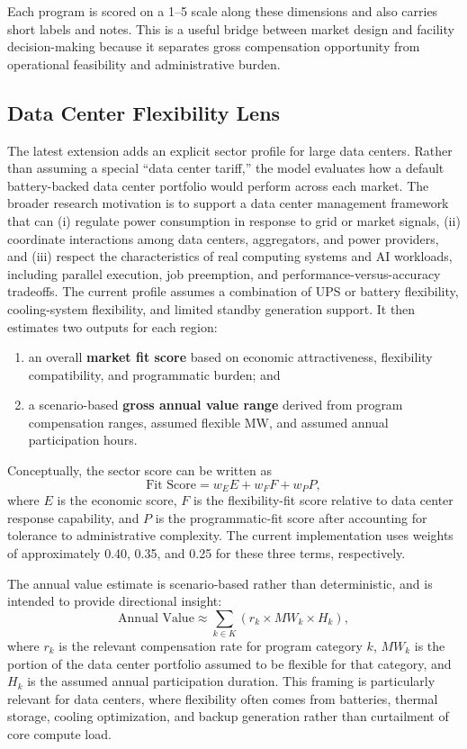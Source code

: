 \documentclass[12pt]{article}
\begin{document}
Each program is scored on a 1--5 scale along these dimensions and also carries short labels and notes. This is a useful bridge between market design and facility decision-making because it separates gross compensation opportunity from operational feasibility and administrative burden.

\subsection{Data Center Flexibility Lens}

The latest extension adds an explicit sector profile for large data centers. Rather than assuming a special ``data center tariff,'' the model evaluates how a default battery-backed data center portfolio would perform across each market. The broader research motivation is to support a data center management framework that can (i) regulate power consumption in response to grid or market signals, (ii) coordinate interactions among data centers, aggregators, and power providers, and (iii) respect the characteristics of real computing systems and AI workloads, including parallel execution, job preemption, and performance-versus-accuracy tradeoffs. The current profile assumes a combination of UPS or battery flexibility, cooling-system flexibility, and limited standby generation support. It then estimates two outputs for each region:
\begin{enumerate}
    \item an overall \textbf{market fit score} based on economic attractiveness, flexibility compatibility, and programmatic burden; and
    \item a scenario-based \textbf{gross annual value range} derived from program compensation ranges, assumed flexible MW, and assumed annual participation hours.
\end{enumerate}

Conceptually, the sector score can be written as
\[
\text{Fit Score} = w_E E + w_F F + w_P P,
\]
where $E$ is the economic score, $F$ is the flexibility-fit score relative to data center response capability, and $P$ is the programmatic-fit score after accounting for tolerance to administrative complexity. The current implementation uses weights of approximately 0.40, 0.35, and 0.25 for these three terms, respectively.

The annual value estimate is scenario-based rather than deterministic, and is intended to provide directional insight:
\[
\text{Annual Value} \approx \sum_{k \in K} \left( r_k \times MW_k \times H_k \right),
\]
where $r_k$ is the relevant compensation rate for program category $k$, $MW_k$ is the portion of the data center portfolio assumed to be flexible for that category, and $H_k$ is the assumed annual participation duration. This framing is particularly relevant for data centers, where flexibility often comes from batteries, thermal storage, cooling optimization, and backup generation rather than curtailment of core compute load.
\end{document}
